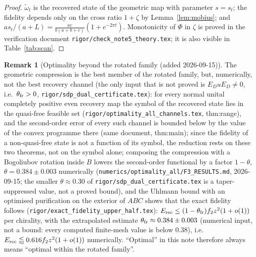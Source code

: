 \documentclass[11pt]{article}
\theoremstyle{accent}
\theoremstyle{definition}
\newtheorem{remark}[theorem]{Remark}
\begin{document}
\begin{proof}
\(\widetilde\omega_t\) is the recovered state of the geometric map with parameter \(s=s_t\); the fidelity depends only on the cross ratio \(1+\zeta\) by Lemma~\ref{lem:mobius}; and \(as_t/(a+L)=\frac{ac}{b(a+b+c)}(1+e^{-2\pi t})\).  Monotonicity of \(\Phi\) in \(\zeta\) is proved in the verification document \texttt{rigor/check\_note5\_theory.tex}; it is also visible in Table~\ref{tab:scan}.
\end{proof}

\begin{remark}[Optimality beyond the rotated family (added 2026-09-15)]
The geometric compression is the best member of the rotated family, but, numerically, not the best recovery channel (the only input that is not proved is \(E_DuE_D\ne0\), i.e.\ \(\theta_{\rm fr}>0\), \texttt{rigor/sdp\_dual\_certificate.tex}): for every normal unital completely positive even recovery map the symbol of the recovered state lies in the quasi-free feasible set (\texttt{rigor/optimality\_all\_channels.tex}, thm:range), and the second-order error of every such channel is bounded below by the value of the convex programme there (same document, thm:main); since the fidelity of a non-quasi-free state is not a function of its symbol, the reduction rests on these two theorems, not on the symbol alone; composing the compression with a Bogoliubov rotation inside \(B\) lowers the second-order functional by a factor \(1-\theta\), \(\theta=0.384\pm0.003\) numerically (\texttt{numerics/optimality\_all/F3\_RESULTS.md}, 2026-09-15; the smaller \(\theta\approx0.30\) of \texttt{rigor/sdp\_dual\_certificate.tex} is a taper-suppressed value, not a proved bound), and the Uhlmann bound with an optimised purification on the exterior of \(ABC\) shows that the exact fidelity follows (\texttt{rigor/exact\_fidelity\_upper\_half.tex}): \(E_{\rm rec}\le(1-\theta_{\rm fr})f_2z^2(1+o(1))\) per chirality, with the extrapolated estimate \(\theta_{\rm fr}\approx0.384\pm0.003\) (numerical input, not a bound: every computed finite-mesh value is below \(0.38\)), i.e.\ \(E_{\rm rec}\lessapprox0.616f_2z^2(1+o(1))\) numerically.  ``Optimal'' in this note therefore always means ``optimal within the rotated family''.
\end{remark}
\end{document}
